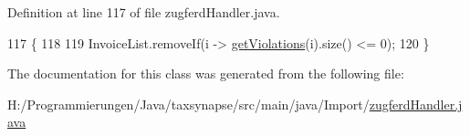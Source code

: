 Definition at line 117 of file zugferd\-Handler.\-java.


\begin{DoxyCode}
117                                                         \{
118         
119         InvoiceList.removeIf(i -> \hyperlink{class_import_1_1zugferd_handler_acf26740b73f820812fadb01ccf712dd2}{getViolations}(i).size() <= 0);
120     \}
\end{DoxyCode}


The documentation for this class was generated from the following file\-:\begin{DoxyCompactItemize}
\item 
H\-:/\-Programmierungen/\-Java/taxsynapse/src/main/java/\-Import/\hyperlink{zugferd_handler_8java}{zugferd\-Handler.\-java}\end{DoxyCompactItemize}
